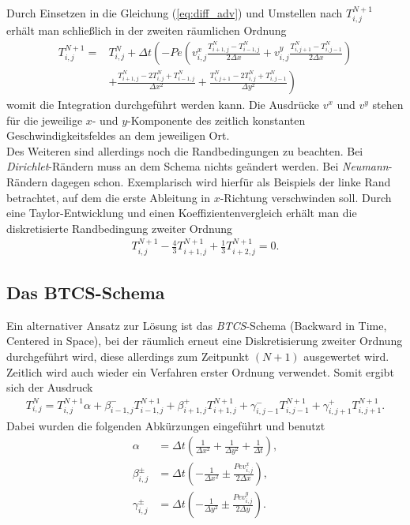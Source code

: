 \documentclass[12pt,a4paper,titlepage,headinclude,bibtotoc]{scrartcl}
\begin{document}
Durch Einsetzen in die Gleichung (\ref{eq:diff_adv}) und Umstellen nach $T_{i,j}^{N+1}$ erhält man schließlich in der zweiten räumlichen Ordnung
\begin{align}
\label{eq:ftcs}
T_{i,j}^{N+1} = &T_{i,j}^N + \Delta t \left( -Pe \left( v^x_{i,j} \frac{T_{i+1,j}^N-T_{i-1,j}^N}{2\Delta x}+v^y_{i,j} \frac{T_{i,j+1}^N-T_{i,j-1}^N}{2\Delta x} \right) \right. \nonumber \\ 
 & \left.+ \frac{ T_{i+1,j}^N - 2 T_{i,j}^N +  T_{i-1,j}^N }{\Delta x^2} 
+ \frac{ T_{i,j+1}^N - 2  T_{i,j}^N + T_{i,j-1}^N}{\Delta y^2} \right) 
\end{align}
womit die Integration durchgeführt werden kann. Die Ausdrücke $v^x$ und $v^y$ stehen für die jeweilige $x$- und $y$-Komponente des zeitlich konstanten Geschwindigkeitsfeldes an dem jeweiligen Ort.\\
Des Weiteren sind allerdings noch die Randbedingungen zu beachten. Bei \textit{Dirichlet}-Rändern muss an dem Schema nichts geändert werden. Bei \textit{Neumann}-Rändern dagegen schon. Exemplarisch wird hierfür als Beispiels der linke Rand betrachtet, auf dem die erste Ableitung in $x$-Richtung verschwinden soll. Durch eine Taylor-Entwicklung und einen Koeffizientenvergleich erhält man die diskretisierte Randbedingung zweiter Ordnung
\begin{align*}
T_{i,j}^{N+1} - \frac{4}{3} T_{i+1,j}^{N+1} + \frac{1}{3} T_{i+2,j}^{N+1} = 0.
\end{align*}


\subsection{Das BTCS-Schema}
Ein alternativer Ansatz zur Lösung ist das \textit{BTCS}-Schema (Backward in Time, Centered in Space), bei der räumlich erneut eine Diskretisierung zweiter Ordnung durchgeführt wird, diese allerdings zum Zeitpunkt $(N+1)$ ausgewertet wird. Zeitlich wird auch wieder ein Verfahren erster Ordnung verwendet.
Somit ergibt sich der Ausdruck
\begin{align}
\label{eq:impli}
T_{i,j}^{N} = T_{i,j}^{N+1} \alpha + \beta^-_{i-1,j} T_{i-1,j}^{N+1} + \beta^+_{i+1,j} T_{i+1,j}^{N+1} + \gamma^-_{i,j-1} T_{i,j-1}^{N+1} + \gamma^+_{i,j+1} T_{i,j+1}^{N+1}.
\end{align}
Dabei wurden die folgenden Abkürzungen eingeführt und benutzt
\begin{align}
\alpha &= \Delta t \left(\frac{1}{\Delta x^2} + \frac{1}{\Delta y^2} + \frac{1}{\Delta t} \right), \\
\beta^\pm_{i,j} &= \Delta t \left(-\frac{1}{\Delta x^2} \pm \frac{Pe v^x_{i,j}}{2 \Delta x}\right), \\
\gamma^\pm_{i,j} &= \Delta t \left(-\frac{1}{\Delta y^2} \pm \frac{Pe v^y_{i,j}}{2 \Delta y}\right).
\end{align}
\end{document}
